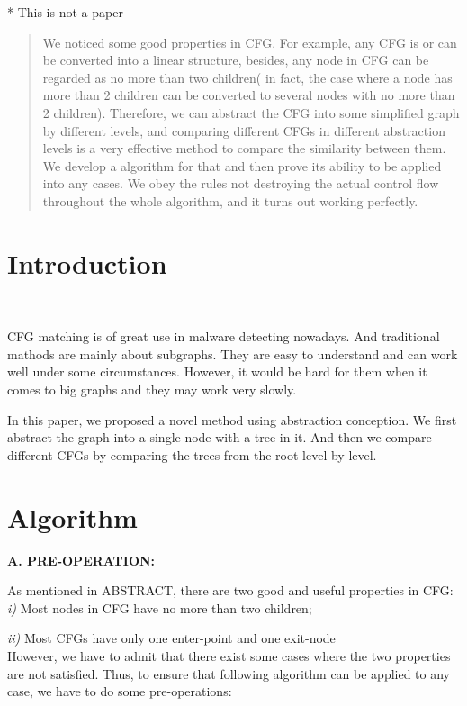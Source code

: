 \documentclass[12pt]{article}
\begin{document}
\maketitle
* This is not a paper
\begin{abstract}
We noticed some good properties in CFG. For example, any CFG is or can be converted into a linear structure, besides, any node in CFG can be regarded as no more than two children( in fact, the case where a node has more than 2 children can be converted to several nodes with no more than 2 children). Therefore, we can abstract the CFG into some simplified graph by different levels, and comparing different CFGs in different abstraction levels is a very effective method to compare the similarity between them. We develop a algorithm for that and then prove its ability to be applied into any cases. We obey the rules not destroying the actual control flow throughout the whole algorithm, and it turns out working perfectly.
\end{abstract}

\section{Introduction}\

CFG matching is of great use in malware detecting nowadays. And traditional mathods are mainly about subgraphs. They are easy to understand and can work well under some circumstances. However, it would be hard for them when it comes to big graphs and they may work very slowly.\

In this paper, we proposed a novel method using abstraction conception. We first abstract the graph into a single node with a tree in it. And then we compare different CFGs by comparing the trees from the root level by level. 
\section{Algorithm}
\textbf{A. PRE-OPERATION:}\

As mentioned in ABSTRACT, there are two good and useful properties in CFG:\\

   		 \textit{i)}	Most nodes in CFG have no more than two children;\

   		 \textit{ii)}	Most CFGs have only one enter-point and one exit-node\\

   	 However, we have to admit that there exist some cases where the two properties are not satisfied. Thus, to ensure that following algorithm can be applied to any case, we have to do some pre-operations:\\
\end{document}
